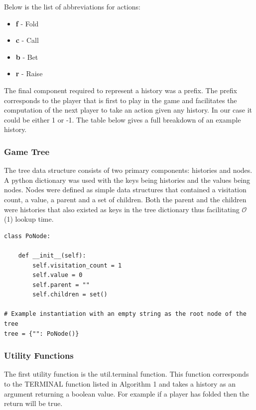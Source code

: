 Below is the list of abbreviations for actions:
\begin{itemize}
    \item \textbf{f} - Fold
    \item \textbf{c} - Call
    \item \textbf{b} - Bet
    \item \textbf{r} - Raise
\end{itemize}

The final component required to represent a history was a prefix.
The prefix corresponds to the player that is first to play in the game and facilitates the computation of
the next player to take an action given any history.
In our case it could be either 1 or -1.
The table below gives a full breakdown of an example history.


\subsubsection{Game Tree}
The tree data structure consists of two primary components: histories and nodes.
A python dictionary was used with the keys being histories and the values being nodes.
Nodes were defined as simple data structures that contained a visitation count, a value,
a parent and a set of children.
Both the parent and the children were histories that also existed as keys in the
tree dictionary thus facilitating $\mathcal{O}$(1) lookup time.

\begin{lstlisting}[style=Python]
class PoNode:

    def __init__(self):
        self.visitation_count = 1
        self.value = 0
        self.parent = ""
        self.children = set()

# Example instantiation with an empty string as the root node of the tree
tree = {"": PoNode()}
\end{lstlisting}

\subsubsection{Utility Functions}\label{subsec:utility}
The first utility function is the util.terminal function.
This function corresponds to the TERMINAL function listed in Algorithm 1 and
takes a history as an argument returning a boolean value.
For example if a player has folded then the return will be true.

